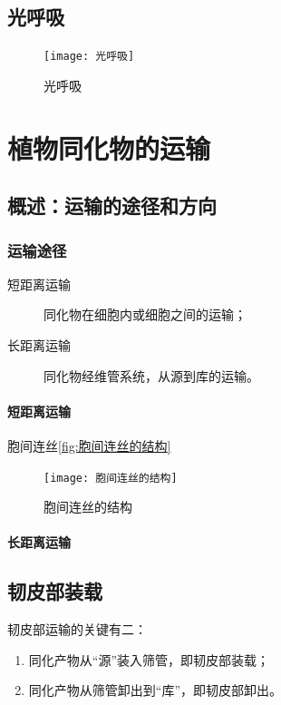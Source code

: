 \subsection{光呼吸}

\begin{figure}[htbp]
	\centering
	\texttt{[image: 光呼吸]}
	\caption{光呼吸}
	\label{fig:光呼吸}
\end{figure}



\section{植物同化物的运输}

\subsection{概述：运输的途径和方向}

\subsubsection{运输途径}

\begin{description}
	\item[短距离运输] 同化物在细胞内或细胞之间的运输；
	\item[长距离运输] 同化物经维管系统，从源到库的运输。
\end{description}

\paragraph{短距离运输}

胞间连丝\autoref{fig:胞间连丝的结构}

\begin{figure}[htbp]
	\centering
	\texttt{[image: 胞间连丝的结构]}
	\caption{胞间连丝的结构}
	\label{fig:胞间连丝的结构}
\end{figure}

\paragraph{长距离运输}

\subsection{韧皮部装载}

韧皮部运输的关键有二：
\begin{enumerate}
	\item 同化产物从“源”装入筛管，即韧皮部装载；
	\item 同化产物从筛管卸出到“库”，即韧皮部卸出。
\end{enumerate}

